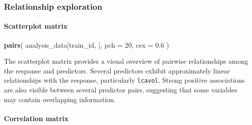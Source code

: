 \documentclass[
  11pt,
]{article}
\newenvironment{Shaded}{\begin{snugshade}}{\end{snugshade}}
\newcommand{\AttributeTok}[1]{\textcolor[rgb]{0.13,0.29,0.53}{#1}}
\newcommand{\DecValTok}[1]{\textcolor[rgb]{0.00,0.00,0.81}{#1}}
\newcommand{\FloatTok}[1]{\textcolor[rgb]{0.00,0.00,0.81}{#1}}
\newcommand{\FunctionTok}[1]{\textcolor[rgb]{0.13,0.29,0.53}{\textbf{#1}}}
\newcommand{\NormalTok}[1]{#1}
\begin{document}
\subsubsection{Relationship exploration}\label{relationship-exploration}

\paragraph{Scatterplot matrix}\label{scatterplot-matrix}

\begin{Shaded}
\begin{Highlighting}[]
\FunctionTok{pairs}\NormalTok{(}
\NormalTok{  analysis\_data[train\_id, ],}
  \AttributeTok{pch =} \DecValTok{20}\NormalTok{,}
  \AttributeTok{cex =} \FloatTok{0.6}
\NormalTok{)}
\end{Highlighting}
\end{Shaded}

The scatterplot matrix provides a visual overview of pairwise
relationships among the response and predictors. Several predictors
exhibit approximately linear relationships with the response,
particularly \texttt{lcavol}. Strong positive associations are also
visible between several predictor pairs, suggesting that some variables
may contain overlapping information.

\paragraph{Correlation matrix}\label{correlation-matrix}
\end{document}
